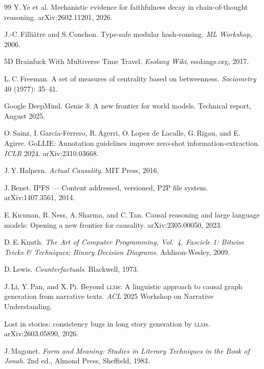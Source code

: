 \documentclass[11pt]{article}
\theoremstyle{rukha}
\begin{document}
\begin{small}
\begin{thebibliography}{99}
Y.\,Ye et al.
\newblock Mechanistic evidence for faithfulness decay in chain-of-thought reasoning.
\newblock arXiv:2602.11201, 2026.

J.-C.\,Filliâtre and S.\,Conchon.
\newblock Type-safe modular hash-consing.
\newblock \emph{ML Workshop}, 2006.

5D Brainfuck With Multiverse Time Travel.
\newblock \emph{Esolang Wiki}, esolangs.org, 2017.

L.\,C.\,Freeman.
\newblock A set of measures of centrality based on betweenness.
\newblock \emph{Sociometry} 40 (1977): 35–41.

Google DeepMind.
\newblock Genie 3: A new frontier for world models.
\newblock Technical report, August 2025.

O.\,Sainz, I.\,García-Ferrero, R.\,Agerri, O.\,Lopez de Lacalle, G.\,Rigau, and E.\,Agirre.
\newblock GoLLIE: Annotation guidelines improve zero-shot information-extraction.
\newblock \emph{ICLR} 2024.
\newblock arXiv:2310.03668.

J.\,Y.\,Halpern.
\newblock \emph{Actual Causality}.
\newblock MIT Press, 2016.

J.\,Benet.
\newblock IPFS — Content addressed, versioned, P2P file system.
\newblock arXiv:1407.3561, 2014.

E.\,Kıcıman, R.\,Ness, A.\,Sharma, and C.\,Tan.
\newblock Causal reasoning and large language models: Opening a new frontier for causality.
\newblock arXiv:2305.00050, 2023.

D.\,E.\,Knuth.
\newblock \emph{The Art of Computer Programming, Vol.~4, Fascicle 1: Bitwise Tricks \& Techniques; Binary Decision Diagrams}.
\newblock Addison-Wesley, 2009.

D.\,Lewis.
\newblock \emph{Counterfactuals}.
\newblock Blackwell, 1973.

J.\,Li, Y.\,Pan, and X.\,Pi.
\newblock Beyond \textsc{llm}s: A linguistic approach to causal graph generation from narrative texts.
\newblock \emph{ACL} 2025 Workshop on Narrative Understanding.

Lost in stories: consistency bugs in long story generation by \textsc{llm}s.
\newblock arXiv:2603.05890, 2026.

J.\,Magonet.
\newblock \emph{Form and Meaning: Studies in Literary Techniques in the Book of Jonah}.
\newblock 2nd ed., Almond Press, Sheffield, 1983.


\end{thebibliography}
\end{small}
\end{document}
